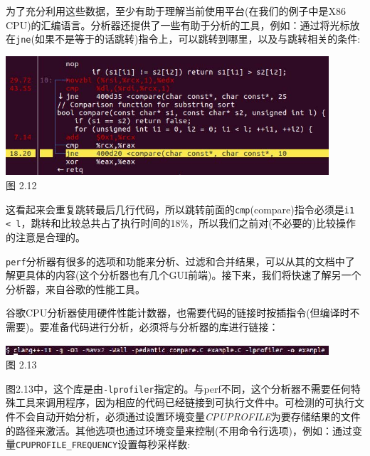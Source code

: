 为了充分利用这些数据，至少有助于理解当前使用平台(在我们的例子中是X86 CPU)的汇编语言。分析器还提供了一些有助于分析的工具，例如：通过将光标放在\texttt{jne}(如果不是等于的话跳转)指令上，可以跳转到哪里，以及与跳转相关的条件:

\begin{center}
\includegraphics[width=0.9\textwidth]{content/1/chapter2/images/12.jpg}\\
图 2.12
\end{center}

这看起来会重复跳转最后几行代码，所以跳转前面的\texttt{cmp}(compare)指令必须是\texttt{i1 < l}，跳转和比较总共占了执行时间的18\%，所以我们之前对(不必要的)比较操作的注意是合理的。

\texttt{perf}分析器有很多的选项和功能来分析、过滤和合并结果，可以从其的文档中了解更具体的内容(这个分析器也有几个GUI前端)。接下来，我们将快速了解另一个分析器，来自谷歌的性能工具。


谷歌CPU分析器使用硬件性能计数器，也需要代码的链接时按插指令(但编译时不需要)。要准备代码进行分析，必须将与分析器的库进行链接：

\begin{center}
\includegraphics[width=0.9\textwidth]{content/1/chapter2/images/13.jpg}\\
图 2.13
\end{center}

图2.13中，这个库是由\texttt{-lprofiler}指定的。与perf不同，这个分析器不需要任何特殊工具来调用程序，因为相应的代码已经链接到可执行文件中。可检测的可执行文件不会自动开始分析，必须通过设置环境变量\textit{CPUPROFILE}为要存储结果的文件的路径来激活。其他选项也通过环境变量来控制(不用命令行选项)，例如：通过变量\texttt{CPUPROFILE\_FREQUENCY}设置每秒采样数:

